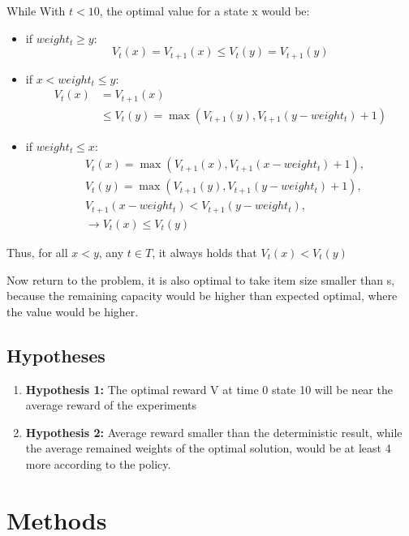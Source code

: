 While With $t<10$, the optimal value for a state x would be:
\begin{itemize}
    \item if $weight_t \ge y$:\\
    $$V_t(x) = V_{t+1}(x) \leq V_{t}(y) = V_{t+1}(y)$$
    \item if $x < weight_t \leq y$:\\
    $$\begin{aligned} V_t(x) &=V_{t+1}(x)\\ &\leq V_{t}(y) = \max(V_{t+1}(y), V_{t+1}(y-weight_t)+1)\end{aligned}$$
    \item if $weight_t \leq x$:\\
    $$\begin{aligned} & V_t(x) = \max(V_{t+1}(x), V_{t+1}(x-weight_t)+1),\\
    & V_{t}(y) = \max(V_{t+1}(y), V_{t+1}(y-weight_t)+1),\\
    & V_{t+1}(x-weight_t)<V_{t+1}(y-weight_t),\\
    & \rightarrow V_t(x) \leq V_t(y)
    \end{aligned} $$
\end{itemize}
 
Thus, for all $x<y$, any $t \in T$, it always holds that $V_t(x)<V_t(y)$

Now return to the problem, it is also optimal to take item size smaller than s, because the remaining capacity would be higher than expected optimal, where the value would be higher. 

\subsection{Hypotheses}
\begin{enumerate}[label=(\roman*)]
    \item\textbf{Hypothesis 1:} The optimal reward V at time 0 state 10 will be near the average reward of the experiments
    \item\textbf{Hypothesis 2:} Average reward smaller than the deterministic result, while the average remained weights of the optimal solution, would be at least 4 more according to the policy.
\end{enumerate}

\section{Methods}

